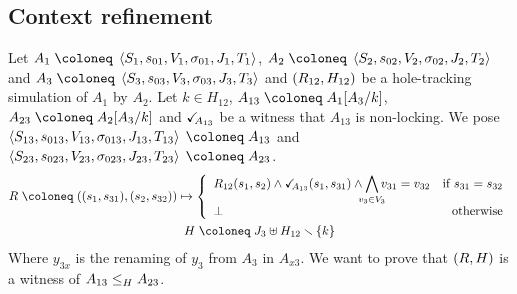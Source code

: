 \documentclass{article}
\begin{document}
\subsection{Context refinement}\label{apx:cr}
Let \(A_1 \defobject \OAg[1]\), \(A_2 \defobject \OAg[2]\) and \(A_3 \defobject \OAg[3]\) and \(\mpar{R_{12}, H_{12}}\) be a hole-tracking simulation of \(A_1\) by \(A_2\).
Let \(k \in H_{12}\), \(A_{13} \defobject A_1\subst{A_3}{k}\), \(A_{23} \defobject A_2\subst{A_3}{k}\) and \(\reach{A_{13}}\) be a witness that \(A_{13}\) is non-locking.
We pose \(\OAg[13] \defobject A_{13}\) and \(\OAg[23] \defobject A_{23}\).
\begin{gather*}
	R \defobject \mpar{\mpar{s_1, s_{31}}, \mpar{s_2, s_{32}}} \mapsto \choice{R_{12}\mpar{s_1, s_2} \wedge \reach{A_{13}}\mpar{s_1, s_{31}} \wedge \bigwedge_\subbox{v_3 \in V_3} v_{31} = v_{32} & \text{if } s_{31} = s_{32} \\ \bot & \text{otherwise}} \\
	H \defobject J_3 \uplus H_{12} \setminus \mbrc{k}
\end{gather*}
Where \(y_{3x}\) is the renaming of \(y_3\) from \(A_3\) in \(A_{x3}\).
We want to prove that \(\mpar{R, H}\) is a witness of \(\wrel{A_{13}}{A_{23}}{H}\).
\end{document}
